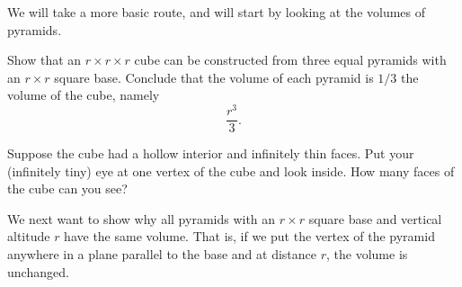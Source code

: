 \documentclass[hints,handout,noauthor,nooutcomes,12pt]{ximera}
\begin{document}
We will take a more basic route, and will start by looking at the
volumes of pyramids.

\begin{problem}
  Show that an $r\times r\times r$ cube can be constructed from three
  equal pyramids with an $r\times r$ square base. Conclude that the
  volume of each pyramid is $1/3$ the volume of the cube, namely
  \[
  \frac{r^{3}}{3}.
  \]

\begin{hint}
  Suppose the cube had a hollow interior and infinitely thin
  faces. Put your (infinitely tiny) eye at one vertex of the cube and
  look inside. How many faces of the cube can you see?
\end{hint}

\begin{freeResponse}
\begin{image}
\end{image}
\end{freeResponse}
\end{problem}

We next want to show why all pyramids with an $r\times r$ square base
and vertical altitude $r$ have the same volume. That is, if we put the
vertex of the pyramid anywhere in a plane parallel to the base and at
distance $r$, the volume is unchanged.
\end{document}

